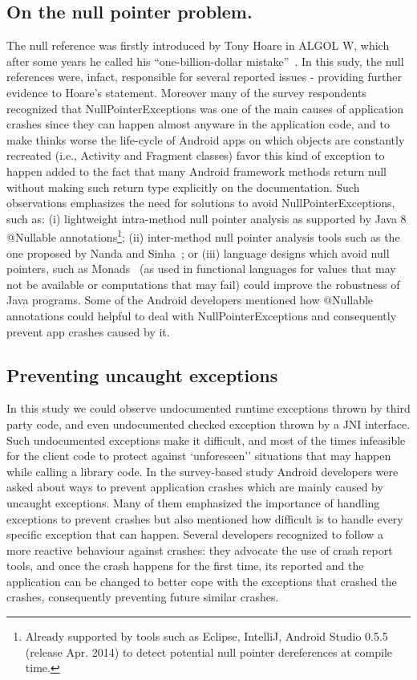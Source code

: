 \subsection{On the null pointer problem.}
The null reference was firstly introduced by Tony Hoare in ALGOL W, which after some years he called his ``one-billion-dollar mistake''~\cite{hoare2}.
In this sudy, the null references were, infact, responsible for several reported issues - providing further evidence to Hoare's statement. Moreover many of the survey respondents recognized that NullPointerExceptions was one of the main causes of application crashes since they can happen almost 
anyware in the application code, and to make thinks worse the life-cycle of Android apps on which objects are constantly recreated (i.e., Activity and Fragment classes) favor this kind of exception to happen added to the fact that many Android framework methods return null without making such
return type explicitly on the documentation.
Such observations emphasizes the need for solutions to avoid NullPointerExceptions, such as:
(i) lightweight intra-method null pointer analysis as supported by
Java 8 @Nullable annotations\footnote{Already supported by tools such as Eclipse, IntelliJ, Android Studio 0.5.5 (release Apr. 2014) to detect potential 
null pointer dereferences at compile time.};
(ii) inter-method null pointer analysis tools such as the one proposed by Nanda and Sinha~\cite{nanda2009accurate};
or (iii) language designs which avoid null pointers, such 
as Monads~\cite{Walde95} (as used in functional languages for values that may not be available 
or computations that may fail) could improve the robustness of Java programs. 
Some of the Android developers mentioned how @Nullable annotations could helpful to deal with
NullPointerExceptions and consequently prevent app crashes caused by it.


\subsection{Preventing uncaught exceptions}
In this study we could observe undocumented runtime exceptions thrown by third party code,
and even undocumented checked exception thrown by a JNI interface.
Such undocumented exceptions make it difficult, and most of the times infeasible
for the client code to protect against `unforeseen'' situations that may happen 
while calling a library code. In the survey-based study Android developers were asked about
ways to prevent application crashes which are mainly caused by uncaught exceptions.
Many of them emphasized the importance of handling exceptions to prevent crashes
but also mentioned how difficult is to handle every specific exception that can happen.
Several developers recognized to follow a more reactive behaviour against crashes:
they advocate the use of crash report tools, and once the crash happens for the first time,
its reported and the application can be changed to better cope with the exceptions that crashed the crashes, consequently preventing future similar crashes.

